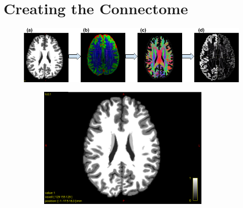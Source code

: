 \documentclass[msthesis.tex]{subfiles}
\begin{document}
\section{Creating the Connectome}
\begin{figure}
    \centering
    \includegraphics[width=\textwidth]{images/Preprocessing_pipeline.png}
    \iffalse
    \begin{subfigure}[b]{0.4\textwidth}
         \centering
         \vspace{-2em}
         \includegraphics[height=0.8\textwidth,width=0.9\textwidth]{images/5tt.png}
         \caption{}
         \label{fig:1M_tract}
     \end{subfigure}
    \hfill
    \begin{subfigure}[b]{0.4\textwidth}
         \centering
         

\end{subfigure}
\end{figure}
\end{document}
